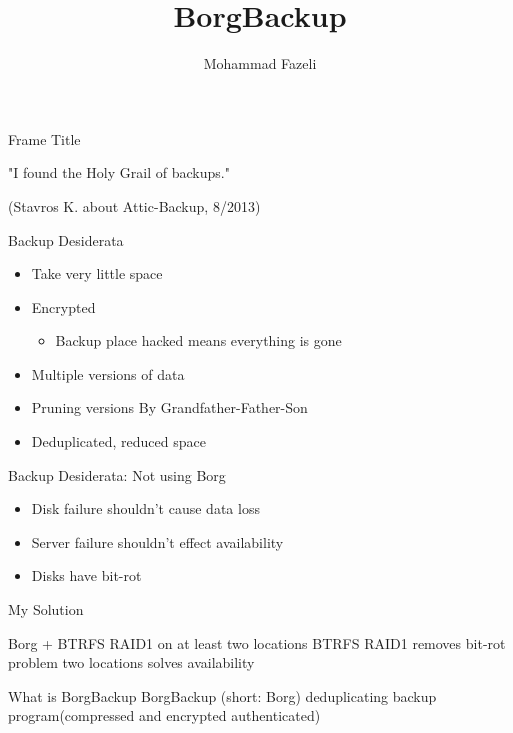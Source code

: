 \documentclass{beamer}
\title{BorgBackup}
\author{Mohammad Fazeli}
\begin{document}
\begin{frame}[plain]
    \maketitle
\end{frame}
\begin{frame}{Frame Title}
	\begin{center}
	"I found the Holy Grail of backups."
	
	(Stavros K. about Attic-Backup, 8/2013)
	\end{center}
\end{frame}
\begin{frame}{Backup Desiderata}
	\begin{itemize}
		\item Take very little space
		\item Encrypted
		\begin{itemize}
			\item Backup place hacked means everything is gone
		\end{itemize}
		\item Multiple versions of data
		\item Pruning versions By Grandfather-Father-Son
		\item Deduplicated, reduced space
	\end{itemize}
\end{frame}
\begin{frame}{Backup Desiderata: Not using Borg}
\begin{itemize}
	\item Disk failure shouldn't cause data loss
	\item Server failure shouldn't effect availability
	\item Disks have bit-rot
\end{itemize}
\end{frame}
\begin{frame}{My Solution}
\begin{center}
	Borg + BTRFS RAID1 on at least two locations  
	BTRFS RAID1 removes bit-rot problem  
	two locations solves availability 
\end{center}
\end{frame}

\begin{frame}{What is BorgBackup}
	BorgBackup (short: Borg) deduplicating backup program(compressed and encrypted authenticated)
\end{frame}
\end{document}

